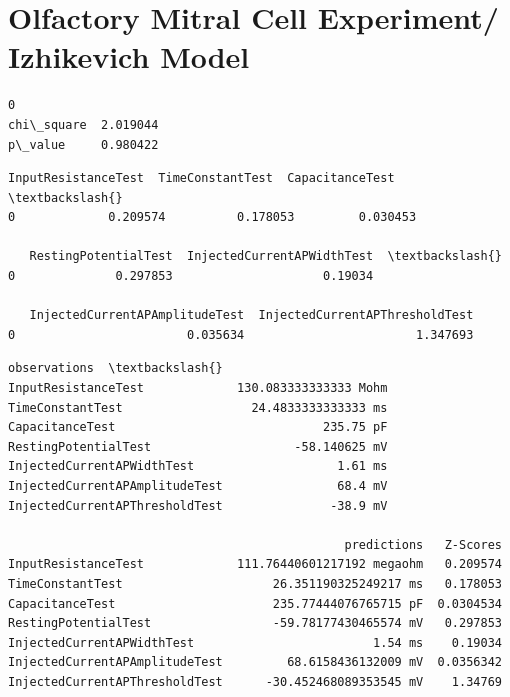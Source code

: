     \hypertarget{olfactory-mitral-cell-experiment-izhikevich-model}{%
\section{Olfactory Mitral Cell Experiment/ Izhikevich
Model}\label{olfactory-mitral-cell-experiment-izhikevich-model}}

            \begin{tcolorbox}[breakable, size=fbox, boxrule=.5pt, pad at break*=1mm, opacityfill=0]
\begin{Verbatim}[commandchars=\\\{\}]
                   0
chi\_square  2.019044
p\_value     0.980422
\end{Verbatim}
\end{tcolorbox}
        
            \begin{tcolorbox}[breakable, size=fbox, boxrule=.5pt, pad at break*=1mm, opacityfill=0]
\begin{Verbatim}[commandchars=\\\{\}]
   InputResistanceTest  TimeConstantTest  CapacitanceTest  \textbackslash{}
0             0.209574          0.178053         0.030453

   RestingPotentialTest  InjectedCurrentAPWidthTest  \textbackslash{}
0              0.297853                     0.19034

   InjectedCurrentAPAmplitudeTest  InjectedCurrentAPThresholdTest
0                        0.035634                        1.347693
\end{Verbatim}
\end{tcolorbox}
        
            \begin{tcolorbox}[breakable, size=fbox, boxrule=.5pt, pad at break*=1mm, opacityfill=0]
\begin{Verbatim}[commandchars=\\\{\}]
                                         observations  \textbackslash{}
InputResistanceTest             130.083333333333 Mohm
TimeConstantTest                  24.4833333333333 ms
CapacitanceTest                             235.75 pF
RestingPotentialTest                    -58.140625 mV
InjectedCurrentAPWidthTest                    1.61 ms
InjectedCurrentAPAmplitudeTest                68.4 mV
InjectedCurrentAPThresholdTest               -38.9 mV

                                               predictions   Z-Scores
InputResistanceTest             111.76440601217192 megaohm   0.209574
TimeConstantTest                     26.351190325249217 ms   0.178053
CapacitanceTest                      235.77444076765715 pF  0.0304534
RestingPotentialTest                 -59.78177430465574 mV   0.297853
InjectedCurrentAPWidthTest                         1.54 ms    0.19034
InjectedCurrentAPAmplitudeTest         68.6158436132009 mV  0.0356342
InjectedCurrentAPThresholdTest      -30.452468089353545 mV    1.34769
\end{Verbatim}
\end{tcolorbox}
        
